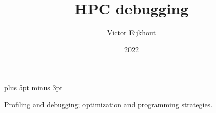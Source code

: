 \documentclass[11pt,headernav]{beamer}
\begin{document}
\parskip=10pt plus 5pt minus 3pt

\title{HPC debugging}
\author{Victor Eijkhout}
\date{2022}

\begin{frame}{}
  \titlepage
\end{frame}

 {Profiling and debugging; optimization and programming strategies.}



\end{document}
